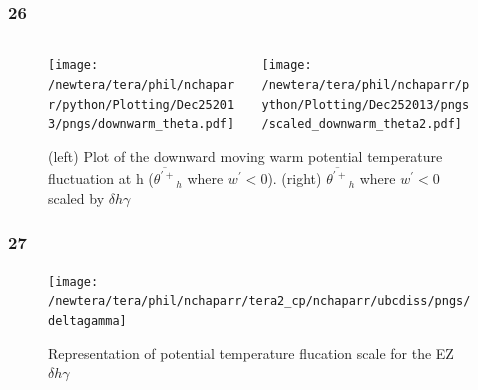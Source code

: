 \documentclass{beamer}
\newcommand\FrameText[1]{
\begin{textblock}{16}(1,2.5)
\raggedright #1
\end{textblock}}
\begin{document}

\begin{frame}
\fontsize{12pt}{7.2}\selectfont
\frametitle{26}
\begin{figure}
\begin{columns}[T]
   \begin{column}{.5\textwidth}
   \texttt{[image: /newtera/tera/phil/nchaparr/python/Plotting/Dec252013/pngs/downwarm\_theta.pdf]} 
   \end{column} 
   
   \begin{column}{.5\textwidth}
    \texttt{[image: /newtera/tera/phil/nchaparr/python/Plotting/Dec252013/pngs/scaled\_downwarm\_theta2.pdf]}
   \end{column}     
\end{columns}
\caption{(left) Plot of the downward moving warm potential temperature fluctuation at h ($\overline{\theta^{'+}}_{h}$ where $w^{'}<0$). (right) $\overline{\theta^{'+}}_{h}$ where $w^{'}<0$ scaled by $\delta h \gamma$}
\end{figure}
\end{frame}

\begin{frame}
\frametitle{27}
\fontsize{12pt}{7.2}\selectfont
\begin{figure}
\texttt{[image: /newtera/tera/phil/nchaparr/tera2\_cp/nchaparr/ubcdiss/pngs/deltagamma]}
\caption{Representation of potential temperature flucation scale for the EZ $\delta h \gamma$}
\end{figure}
\end{frame}
\end{document}
